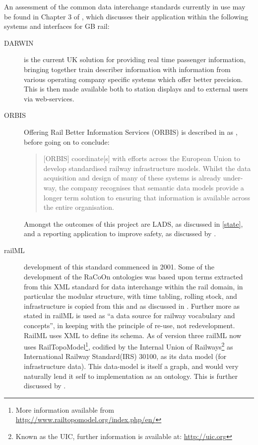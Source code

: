 An assessment of the common data interchange standards currently in use may be found in Chapter 3 of \citet{Tutcher2015}, which discusses their application within the following systems and interfaces for GB rail:
\begin{description}
    \item[DARWIN] is the current UK solution for providing real time passenger information, bringing together train describer information with information from various operating company specific systems which offer better precision. This is then made available both to station displays and to external users via web-services.
    \item[ORBIS] Offering Rail Better Information Services (ORBIS) is described in \citet{Tutcher2015}  as , before going on to conclude: 
    \begin{quote}
       [ORBIS] coordinate[s] with efforts across the European Union to develop standardised railway infrastructure models. Whilst the data acquisition and design of many of these systems is already under-way, the company recognises that semantic data models provide a longer term solution to ensuring that information is available across the entire organisation.
    \end{quote}
    Amongst the outcomes of this project are LADS, as discussed in \autoref{state}, and a  reporting application to improve safety, as discussed by \citet{Rail}.
    \item[railML] development of this standard commenced in 2001. Some of the development of the RaCoOn ontologies was based upon terms extracted from this XML standard for data interchange within the rail domain,  in particular the modular structure, with time tabling, rolling stock, and infrastructure is copied from this and as discussed in \citet{Tutcher2015}. Further more as stated in \citet{Tutcher2015} railML is used as ``a data source for railway vocabulary and concepts'', in keeping with the principle of re-use, not redevelopment. RailML uses XML to define its schema. As of version three railML now uses RailTopoModel\footnote{More information available from \url{http://www.railtopomodel.org/index.php/en/}}, codified by the Internal Union of Railways\footnote{Known as the UIC, further information is available at: \url{http://uic.org} } as International Railway Standard(IRS) 30100, as its data model (for infrastructure data). This data-model is itself a graph, and would very naturally lend it self to implementation as an ontology. This is further discussed by \citet{Nash2010}.

\end{description}
